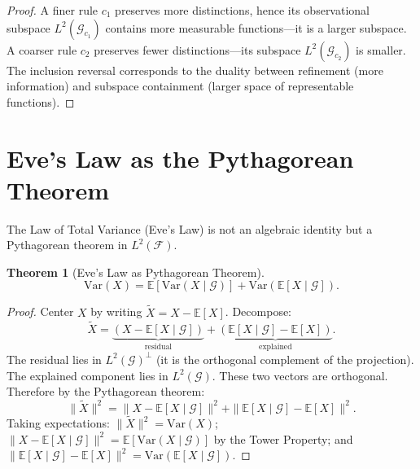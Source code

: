 \documentclass[12pt, a4paper, openany]{book}
\theoremstyle{plain}
\newtheorem{theorem}{Theorem}[chapter]
\theoremstyle{definition}
\theoremstyle{remark}
\begin{document}
\begin{proof}
A finer rule $c_1$ preserves more distinctions, hence its observational subspace
$L^2(\mathcal{G}_{c_1})$ contains more measurable functions---it is a larger
subspace. A coarser rule $c_2$ preserves fewer distinctions---its subspace
$L^2(\mathcal{G}_{c_2})$ is smaller. The inclusion reversal corresponds to the
duality between refinement (more information) and subspace containment (larger
space of representable functions).
\end{proof}

\section{Eve's Law as the Pythagorean Theorem}

The Law of Total Variance (Eve's Law) is not an algebraic identity but a
Pythagorean theorem in $L^2(\mathcal{F})$.

\begin{theorem}[Eve's Law as Pythagorean Theorem]
\[
\mathrm{Var}(X) = \mathbb{E}[\mathrm{Var}(X \mid \mathcal{G})] + \mathrm{Var}(\mathbb{E}[X \mid \mathcal{G}]).
\]
\end{theorem}

\begin{proof}
Center $X$ by writing $\tilde{X} = X - \mathbb{E}[X]$. Decompose:
\[
\tilde{X} = \underbrace{(X - \mathbb{E}[X \mid \mathcal{G}])}_{\text{residual}} +
            \underbrace{(\mathbb{E}[X \mid \mathcal{G}] - \mathbb{E}[X])}_{\text{explained}}.
\]
The residual lies in $L^2(\mathcal{G})^\perp$ (it is the orthogonal complement
of the projection). The explained component lies in $L^2(\mathcal{G})$. These
two vectors are orthogonal. Therefore by the Pythagorean theorem:
\[
\|\tilde{X}\|^2 = \|X - \mathbb{E}[X\mid\mathcal{G}]\|^2 +
                  \|\mathbb{E}[X\mid\mathcal{G}] - \mathbb{E}[X]\|^2.
\]
Taking expectations: $\|\tilde{X}\|^2 = \mathrm{Var}(X)$;
$\|X - \mathbb{E}[X\mid\mathcal{G}]\|^2 = \mathbb{E}[\mathrm{Var}(X\mid\mathcal{G})]$
by the Tower Property; and $\|\mathbb{E}[X\mid\mathcal{G}] - \mathbb{E}[X]\|^2 =
\mathrm{Var}(\mathbb{E}[X\mid\mathcal{G}])$.
\end{proof}
\end{document}
